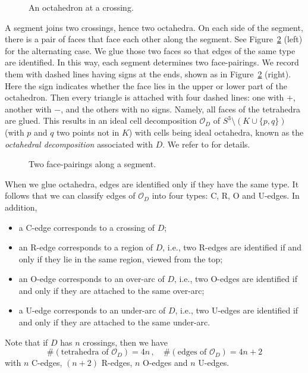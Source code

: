 \documentclass[12pt,reqno]{amsart}
\theoremstyle{definition}
\def\calO{\mathcal O}
\begin{document}
\begin{figure}[htpb!]

\caption{An octahedron at a crossing.}
\label{fig.octahedronatc}
\end{figure}

A segment joins two crossings, hence two octahedra. On each side of the
segment, there is a pair of faces that face each other along the segment. See
Figure~\ref{fig.octahedron} (left) for the alternating case. We glue those two
faces so that edges of the same type are identified. In this way, each segment
determines two face-pairings. We record them with dashed lines having
signs at the ends, shown as in Figure~\ref{fig.octahedron} (right). Here the
sign indicates whether the face lies in the upper or lower part of the octahedron.
Then every triangle is attached with four dashed lines: one with
$+$, another with $-$, and the others with no signs. Namely, all faces of the
tetrahedra are glued. This results in an ideal cell decomposition $\calO_D$
of $S^3 \setminus (K \cup \{p,q\})$ (with $p$ and $q$ two points not in $K$)
with cells being ideal octahedra, known as the \emph{octahedral decomposition}
associated with $D$.  We refer to \cite{KKY18} for details.

\begin{figure}[htpb!]

\caption{Two face-pairings along a segment.}
\label{fig.octahedron}
\end{figure}

When we glue octahedra, edges are identified only if they have the same type.
It follows that we can classify edges of $\calO_D$ into four types:
C, R, O and U-edges. In addition,
\begin{itemize}
\item a C-edge corresponds to a crossing of $D$;
\item an R-edge corresponds to a region of $D$, i.e., two R-edges
are identified if and only if they lie in the same region, viewed from the top;
\item an O-edge corresponds to an over-arc of $D$, i.e., two
O-edges are identified if and only if they are attached to the same over-arc;
\item a U-edge corresponds to an under-arc of $D$, i.e., two
U-edges are identified if and only if they are attached to the same under-arc. 
\end{itemize}
Note that if $D$ has $n$ crossings, then we have
\begin{equation*}
  \# ( \textrm{tetrahedra of } \calO_D) = 4n\, , \quad
  \# ( \textrm{edges of } \calO_D) = 4n+2
\end{equation*}
with $n$ C-edges, $(n+2)$ R-edges, $n$ O-edges and $n$
U-edges.
\end{document}
